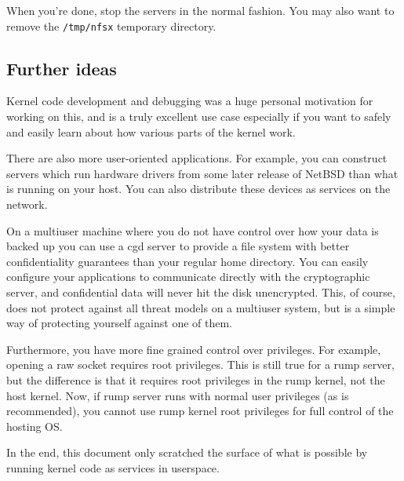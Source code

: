 When you're done, stop the servers in the normal fashion.  You may
also want to remove the \verb+/tmp/nfsx+ temporary
directory.

\subsection{Further ideas}

Kernel code development and debugging was a huge personal motivation
for working on this, and is a truly excellent use case especially
if you want to safely and easily learn about how various parts of
the kernel work.

There are also more user-oriented applications.  For example, you
can construct servers which run hardware drivers from some later
release of NetBSD than what is running on your host.  You can also
distribute these devices as services on the network.

On a multiuser machine where you do not have control over how your
data is backed up you can use a cgd server to provide a file system
with better confidentiality guarantees than your regular home
directory.  You can easily configure your applications to communicate
directly with the cryptographic server, and confidential data will
never hit the disk unencrypted.  This, of course, does not protect
against all threat models on a multiuser system, but is a simple
way of protecting yourself against one of them.

Furthermore, you have more fine grained control over privileges.  For
example, opening a raw socket requires root privileges.  This is
still true for a rump server, but the difference is that it requires
root privileges in the rump kernel, not the host kernel.  Now, if
rump server runs with normal user privileges (as is recommended),
you cannot use rump kernel root privileges for full control of the
hosting OS.

In the end, this document only scratched the surface of what is
possible by running kernel code as services in userspace.
